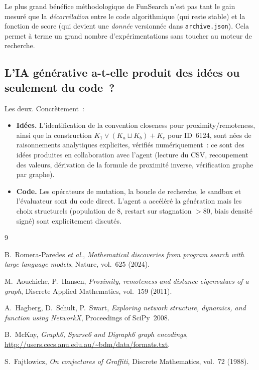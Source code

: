 \documentclass[11pt,a4paper]{article}
\begin{document}
Le plus grand bénéfice méthodologique de FunSearch n'est pas tant le gain
mesuré que la \emph{décorrélation} entre le code \og{}algorithmique\fg{}
(qui reste stable) et la fonction de score (qui devient une \emph{donnée}
versionnée dans \texttt{archive.json}). Cela permet à terme un grand nombre
d'expérimentations sans toucher au moteur de recherche.

\subsection{L'IA générative a-t-elle produit des idées ou seulement du
code~?}

Les deux. Concrètement~:
\begin{itemize}
  \item \textbf{Idées.} L'identification de la convention closeness pour
    proximity/remoteness, ainsi que la construction
    $K_1 \vee (K_a \sqcup K_b) + K_c$ pour ID~6124, sont nées de
    raisonnements analytiques explicites, vérifiés numériquement~: ce
    sont des idées produites en collaboration avec l'agent (lecture du
    CSV, recoupement des valeurs, dérivation de la formule de proximité
    inverse, vérification graphe par graphe).
  \item \textbf{Code.} Les opérateurs de mutation, la boucle de recherche,
    le sandbox et l'évaluateur sont du code direct. L'agent a accéléré la
    génération mais les choix structurels (population de $8$, restart sur
    stagnation $> 80$, biais densité signé) sont explicitement discutés.
\end{itemize}

\begin{thebibliography}{9}

B.~Romera-Paredes \emph{et al.}, \emph{Mathematical discoveries from program
search with large language models}, Nature, vol.~625 (2024).

M.~Aouchiche, P.~Hansen, \emph{Proximity, remoteness and distance
eigenvalues of a graph}, Discrete Applied Mathematics, vol.~159 (2011).

A.~Hagberg, D.~Schult, P.~Swart, \emph{Exploring network structure,
dynamics, and function using NetworkX}, Proceedings of SciPy~2008.

B.~McKay, \emph{Graph6, Sparse6 and Digraph6 graph encodings},
\url{http://users.cecs.anu.edu.au/~bdm/data/formats.txt}.

S.~Fajtlowicz, \emph{On conjectures of Graffiti}, Discrete Mathematics,
vol.~72 (1988).

\end{thebibliography}
\end{document}
